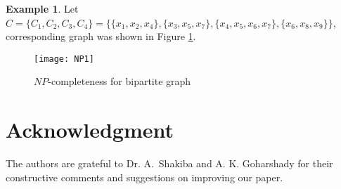 \documentclass[A4,12pt]{article}
\theoremstyle{definition}
\newtheorem{example}[theorem]{Example}
\theoremstyle{remark}
\begin{document}
\begin{example}
	Let $C=\{C_1,C_2,C_3,C_4\}=\{\{x_1,x_2,x_4\},\{x_3,x_5,x_7\},\{x_4,x_5,x_6,x_7\},\{x_6,x_8,x_9\}\}$, corresponding graph was shown in Figure \ref{fig:npgraph2}.
	\begin{figure}[h!]
		\centering
		\texttt{[image: NP1]}
		\caption{$NP$-completeness for bipartite graph}
		\label{fig:npgraph2}
	\end{figure}
\end{example}
 \section*{Acknowledgment}
        The authors are grateful to  Dr. A.~Shakiba and A. K. Goharshady for their constructive comments and suggestions on improving  our paper.



\end{document}
